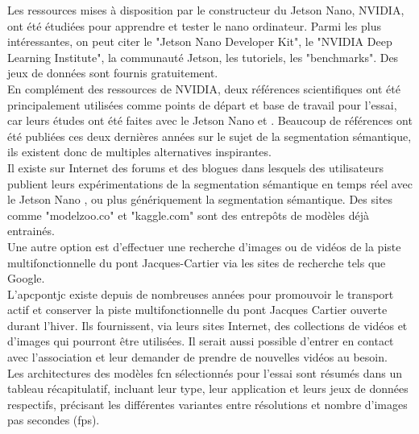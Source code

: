 ﻿\noindent Les ressources mises à disposition par le constructeur du Jetson Nano, NVIDIA, ont été étudiées pour apprendre et tester le nano ordinateur. Parmi les plus intéressantes, on peut citer le "Jetson Nano Developer Kit", le "NVIDIA Deep Learning Institute", la communauté Jetson, les tutoriels, les "benchmarks". Des jeux de données sont fournis gratuitement.
\vspace{\baselineskip}
\\
\noindent En complément des ressources de NVIDIA, deux références scientifiques ont été principalement utilisées comme points de départ et base de travail pour l'essai, car leurs études ont été faites avec le Jetson Nano \parencite{nguyen_mavnet_2019} et \parencite{zheng_real-time_2020}. Beaucoup de références ont été publiées ces deux dernières années sur le sujet de la segmentation sémantique, ils existent donc de multiples alternatives inspirantes.
\vspace{\baselineskip}
\\
\noindent Il existe sur Internet des forums et des blogues dans lesquels des utilisateurs publient leurs expérimentations de la segmentation sémantique en temps réel avec le Jetson Nano \parencite{dustin_realtime_2019}, ou plus génériquement la segmentation sémantique. Des sites comme "modelzoo.co" et "kaggle.com" sont des entrepôts de modèles déjà entrainés. 
\vspace{\baselineskip}
\\
\noindent Une autre option est d'effectuer une recherche d'images ou de vidéos de la piste multifonctionnelle du pont Jacques-Cartier via les sites de recherche tels que Google. 
\vspace{\baselineskip}
\\
\noindent L'\acrlong{apcpontjc} existe depuis de nombreuses années pour promouvoir le transport actif et conserver la piste multifonctionnelle du pont Jacques Cartier ouverte durant l'hiver. Ils fournissent, via leurs sites Internet, des collections de vidéos et d'images qui pourront être utilisées. Il serait aussi possible d'entrer en contact avec l'association et leur demander de prendre de nouvelles vidéos au besoin. \parencite{association_des_pietons_et_cyclistes_du_pont_jacques-cartier_pontjacques-cartier365com_2020, association_des_pietons_et_cyclistes_pont_jacques-cartier_flickr_2020}
\vspace{\baselineskip}
\\
\noindent Les architectures des modèles \acrshort{fcn} sélectionnés pour l'essai sont résumés dans un tableau récapitulatif, incluant leur type, leur application et leurs jeux de données respectifs, précisant les différentes variantes entre résolutions et nombre d'images pas secondes (\acrshort{fps}).